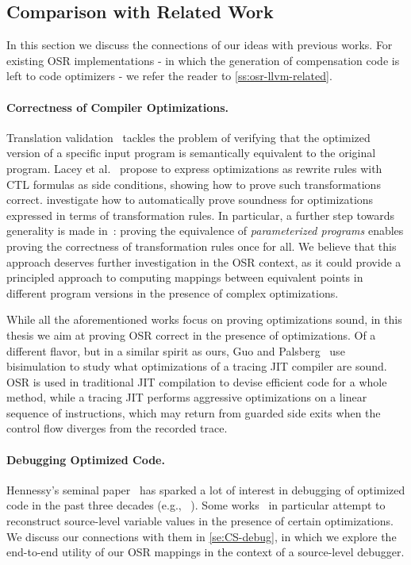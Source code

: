 
\subsection{Comparison with Related Work}
In this section we discuss the connections of our ideas with previous works. For existing OSR implementations - in which the generation of compensation code is left to code optimizers - we refer the reader to \mysection\ref{ss:osr-llvm-related}.

\paragraph*{Correctness of Compiler Optimizations.} Translation validation~\cite{Pnueli98, Necula00} tackles the problem of verifying that the optimized version of a specific input program is semantically equivalent to the original program. Lacey et al.~\cite{Lacey02, Lacey04} propose to express optimizations as rewrite rules with CTL formulas as side conditions, showing how to prove such transformations correct. \cite{Lerner03, Lerner05, Kundu09} investigate how to automatically prove soundness for optimizations expressed in terms of transformation rules. In particular, a further step towards generality is made in~\cite{Kundu09}: proving the equivalence of {\em parameterized programs} enables proving the correctness of transformation rules once for all. We believe that this approach deserves further investigation in the OSR context, as it could provide a principled approach to computing mappings between equivalent points in different program versions in the presence of complex optimizations. 

While all the aforementioned works focus on proving optimizations sound, in this thesis we aim at proving OSR correct in the presence of optimizations. Of a different flavor, but in a similar spirit as ours, Guo and Palsberg~\cite{Guo11} use bisimulation to study what optimizations of a tracing JIT compiler are sound. OSR is used in traditional JIT compilation to devise efficient code for a whole method, while a tracing JIT performs aggressive optimizations on a linear sequence of instructions, which may return from guarded side exits when the control flow diverges from the recorded trace.

\paragraph*{Debugging Optimized Code.} Hennessy's seminal paper~\cite{Hennessy82} has sparked a lot of interest in debugging of optimized code in the past three decades (e.g., ~\cite{Coutant88, Adl-Tabatabai96, Wu99, Jaramillo00, Barr14}). Some works~\cite{Hennessy82, Wu99} in particular attempt to reconstruct source-level variable values in the presence of certain optimizations. We discuss our connections with them in \mysection\ref{se:CS-debug}, in which we explore the end-to-end utility of our OSR mappings in the context of a source-level debugger.

